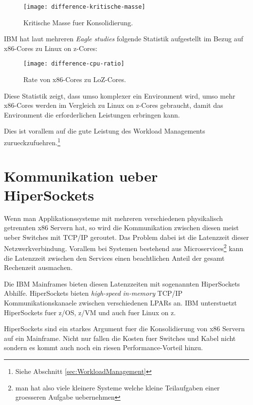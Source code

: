 \begin{figure}[h!]
\centering
\texttt{[image: difference-kritische-masse]}
\caption{Kritische Masse fuer Konsolidierung\cite{KonsolidierungKritischeMasse}.}
\label{fig:KonsolidierungKritischeMasse}
\end{figure}

IBM hat laut mehreren \textit{Eagle studies} folgende Statistik aufgestellt im Bezug auf x86-Cores zu Linux on z-Cores:

\begin{figure}[h!]
\centering
\texttt{[image: difference-cpu-ratio]}
\caption{Rate von x86-Cores zu LoZ-Cores\cite{CPURatio}.}
\label{fig:CPURatio}
\end{figure}

Diese Statistik zeigt, dass umso komplexer ein Environment wird, umso mehr x86-Cores werden im Vergleich zu Linux on z-Cores gebraucht,
damit das Environment die erforderlichen Leistungen erbringen kann.

Dies ist vorallem auf die gute Leistung des Workload Managements zurueckzufuehren.\footnote{Siehe Abschnitt \ref{sec:WorkloadManagement}}

\section{Kommunikation ueber HiperSockets}
\label{sec:HiperSockets}

Wenn man Applikationssysteme mit mehreren verschiedenen physikalisch getrennten x86 Servern hat, so wird die Kommunikation zwischen diesen meist ueber Switches mit TCP/IP geroutet. Das Problem dabei ist die Latenzzeit dieser Netzwerkverbindung.
Vorallem bei Systemen bestehend aus Microservices\footnote{man hat also viele kleinere Systeme welche kleine Teilaufgaben einer groesseren Aufgabe uebernehmen} kann die Latenzzeit zwischen den Services einen beachtlichen Anteil der gesamt Rechenzeit ausmachen.

Die IBM Mainframes bieten diesen Latenzzeiten mit sogenannten HiperSockets Abhilfe.\cite{HiperSocketsWiki}
HiperSockets bieten \textit{high-speed} \textit{in-memory} TCP/IP Kommunikationskanaele zwischen verschiedenen LPARs an. IBM unterstuetzt HiperSockets fuer z/OS, z/VM und auch fuer Linux on z.

HiperSockets sind ein starkes Argument fuer die Konsolidierung von x86 Servern auf ein Mainframe. Nicht nur fallen die Kosten fuer Switches und Kabel nicht sondern es kommt auch noch ein riesen Performance-Vorteil hinzu.


